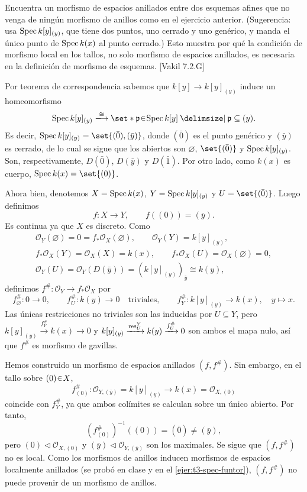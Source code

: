 \begin{ejer}\label{ejer:t3-morfismo-no-local}
Encuentra un morfismo de espacios anillados entre dos esquemas afines que no venga de ningún morfismo de anillos como en el ejercicio anterior. (Sugerencia: usa $\operatorname{Spec} k[y]_{(y)}$, que tiene dos puntos, uno cerrado y uno genérico, y manda el único punto de $\operatorname{Spec} k(x)$ al punto cerrado.) Esto muestra por qué la condición de morfismo local en los tallos, no solo morfismo de espacios anillados, es necesaria en la definición de morfismo de esquemas. \hfill [Vakil 7.2.G]
\end{ejer}
\begin{sol}
Por teorema de correspondencia sabemos que $k[y]\to k[y]_{(y)}$ induce un homeomorfismo
\[
\Spec k[y]_{(y)}\xlongrightarrow{\cong}
\set*{\mathfrak p\en\Spec k[y]\given\mathfrak p\subseteq(y)}.
\]
Es decir, $\Spec k[y]_{(y)}=\set{(\bar0),(\bar y)}$, donde $(\bar0)$ es el punto genérico y $(\bar y)$ es cerrado, de lo cual se sigue que los abiertos son $\varnothing$, $\set{(\bar0)}$ y $\operatorname{Spec} k[y]_{(y)}$. Son, respectivamente, $D(\bar0)$, $D(\bar y)$ y $D(\bar1)$. Por otro lado, como $k(x)$ es cuerpo, $\Spec k(x)=\set{(0)}$.

Ahora bien, denotemos $X=\operatorname{Spec} k(x)$, $Y=\operatorname{Spec} k[y]_{(y)}$ y $U=\set{(\bar0)}$. Luego definimos
\[
f\colon X\longrightarrow Y,
\qquad f((0))=(\bar y).
\]
Es continua ya que $X$ es discreto. Como
\[
\begin{gathered}
\mathcal O_Y(\varnothing)=0=f_*\mathcal O_X(\varnothing),\qquad
\mathcal O_Y(Y)=k[y]_{(y)},\\
f_*\mathcal O_X(Y)=\mathcal O_X(X)=k(x),\qquad
f_*\mathcal O_X(U)=\mathcal O_X(\varnothing)=0,\\
\mathcal O_Y(U)=\mathcal O_Y(D(\bar y))=(k[y]_{(y)})_{\bar y}\cong k(y),
\end{gathered}
\]
definimos $f^\#\colon\mathcal O_Y\to f_*\mathcal O_X$ por
\[
f^\#_{\varnothing}\colon0\to0,\qquad f^\#_U\colon k(y)\to0
\quad\text{triviales},\qquad
f^\#_Y\colon k[y]_{(y)}\to k(x),\quad y\mapsto x.
\]
Las únicas restricciones no triviales son las inducidas por $U\subseteq Y$, pero $k[y]_{(y)}\xrightarrow{f^\#_Y}k(x)\to0$ y $k[y]_{(y)}\xrightarrow{\operatorname{res}_U^Y}k(y)\xrightarrow{f^\#_U}0$ son ambos el mapa nulo, así que $f^\#$ es morfismo de gavillas.

Hemos construido un morfismo de espacios anillados $(f,f^\#)$. Sin embargo, en el tallo sobre $(0)\en X$,
\[
f^\#_{(0)}\colon\mathcal O_{Y,(\bar y)}=k[y]_{(y)}
\longrightarrow k(x)=\mathcal O_{X,(0)}
\]
coincide con $f^\#_Y$, ya que ambos colímites se calculan sobre un único abierto. Por tanto,
\[
(f^\#_{(0)})^{-1}((0))=(\bar0)\ne(\bar y),
\]
pero $(0)\triangleleft\mathcal O_{X,(0)}$ y $(\bar y)\triangleleft\mathcal O_{Y,(\bar y)}$ son los maximales. Se sigue que $(f,f^\#)$ no es local. Como los morfismos de anillos inducen morfismos de espacios localmente anillados (se probó en clase y en el \cref{ejer:t3-spec-funtor}), $(f,f^\#)$ no puede provenir de un morfismo de anillos.
\end{sol}
